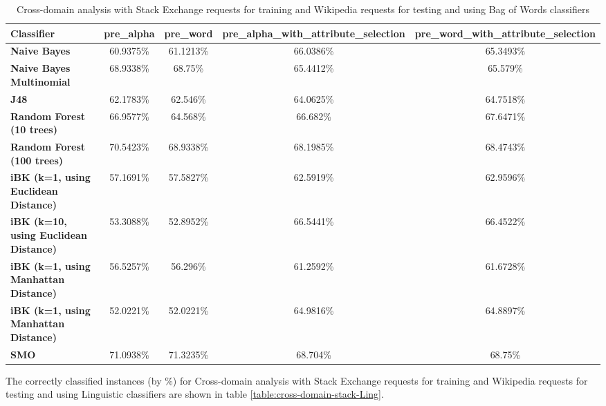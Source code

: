 \documentclass[conference]{IEEEtran}
\begin{document}
\begin{table*}[htbp]
\caption{Cross-domain analysis with Stack Exchange requests for training and Wikipedia requests for testing and using Bag of Words classifiers}
\centering
\vspace{5pt}
\begin{tabular}{|l|c|c|c|c|}
\hline
\textbf{Classifier} & \textbf{pre\_alpha} & \textbf{pre\_word} & \textbf{pre\_alpha\_with\_attribute\_selection} & \textbf{pre\_word\_with\_attribute\_selection} \\
\hline\hline
\textbf{Naive Bayes} & 60.9375\% & 61.1213\% & 66.0386\% & 65.3493\% \\ 
\hline
\textbf{Naive Bayes Multinomial} & 68.9338\% & 68.75\% & 65.4412\% & 65.579\% \\ 
\hline
\textbf{J48} & 62.1783\% & 62.546\% & 64.0625\% & 64.7518\% \\ 
\hline
\textbf{Random Forest (10 trees)} & 66.9577\% & 64.568\% & 66.682\% & 67.6471\% \\ 
\hline
\textbf{Random Forest (100 trees)} & 70.5423\% & 68.9338\% & 68.1985\% & 68.4743\% \\ 
\hline
\textbf{iBK (k=1, using Euclidean Distance)} & 57.1691\% & 57.5827\% & 62.5919\% & 62.9596\% \\ 
\hline
\textbf{iBK (k=10, using Euclidean Distance)} & 53.3088\% & 52.8952\% & 66.5441\% & 66.4522\% \\ 
\hline
\textbf{iBK (k=1, using Manhattan Distance)} & 56.5257\% & 56.296\% & 61.2592\% & 61.6728\% \\ 
\hline
\textbf{iBK (k=1, using Manhattan Distance)} & 52.0221\% & 52.0221\% & 64.9816\% & 64.8897\% \\ 
\hline
\textbf{SMO} & 71.0938\% & 71.3235\% & 68.704\% & 68.75\% \\ 
\hline
\hline
\end{tabular}
\label{table:cross-domain-stack-BOW}
\end{table*}

The correctly classified instances (by \%) for Cross-domain analysis with Stack Exchange requests for training and Wikipedia requests for testing and using Linguistic classifiers are shown in table \ref{table:cross-domain-stack-Ling}.
\end{document}
